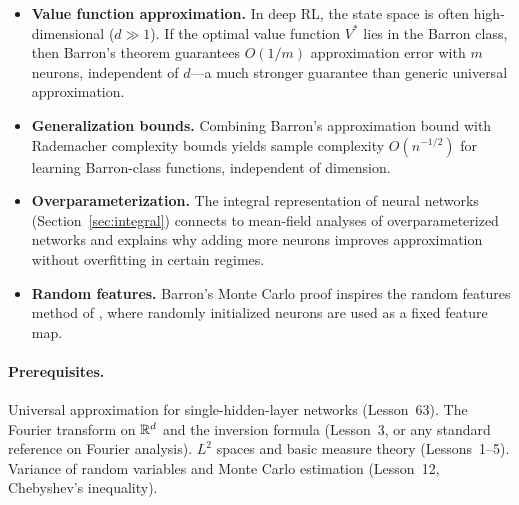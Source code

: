 \documentclass[11pt,a4paper]{article}
\begin{document}
\begin{rlconnection}[title={Why Barron's Theorem Matters for RL/ML}]
\begin{itemize}[nosep]
  \item \textbf{Value function approximation.}  In deep RL, the state
    space is often high-dimensional ($d \gg 1$).  If the optimal value
    function $V^*$ lies in the Barron class, then Barron's theorem
    guarantees $O(1/m)$ approximation error with $m$ neurons, independent
    of $d$---a much stronger guarantee than generic universal approximation.
  \item \textbf{Generalization bounds.}  Combining Barron's approximation
    bound with Rademacher complexity bounds yields sample complexity
    $O(n^{-1/2})$ for learning Barron-class functions, independent of
    dimension.
  \item \textbf{Overparameterization.}  The integral representation of
    neural networks (Section~\ref{sec:integral}) connects to mean-field
    analyses of overparameterized networks and explains why adding more
    neurons improves approximation without overfitting in certain regimes.
  \item \textbf{Random features.}  Barron's Monte Carlo proof inspires
    the random features method of \citet{rahimi2008}, where randomly
    initialized neurons are used as a fixed feature map.
\end{itemize}
\end{rlconnection}

\paragraph{Prerequisites.}
Universal approximation for single-hidden-layer networks (Lesson~63).
The Fourier transform on $\mathbb{R}^d$ and the inversion formula (Lesson~3,
or any standard reference on Fourier analysis).  $L^2$ spaces and basic
measure theory (Lessons~1--5).  Variance of random variables and Monte
Carlo estimation (Lesson~12, Chebyshev's inequality).
\end{document}
